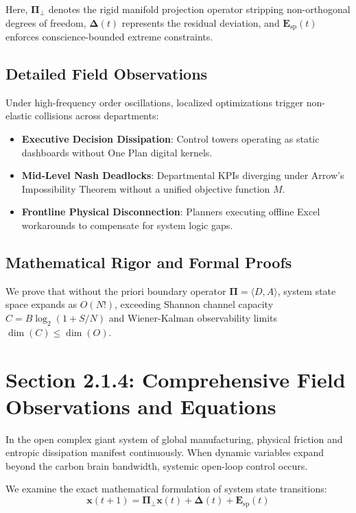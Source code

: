 \documentclass[12pt,a4paper,oneside]{book}
\begin{document}
Here, $\mathbf{\Pi}_{\bot}$ denotes the rigid manifold projection operator stripping non-orthogonal degrees of freedom, $\mathbf{\Delta}(t)$ represents the residual deviation, and $\mathbf{E}_{\mathrm{sp}}(t)$ enforces conscience-bounded extreme constraints.

\subsection*{Detailed Field Observations}
Under high-frequency order oscillations, localized optimizations trigger non-elastic collisions across departments:
\begin{itemize}
    \item \textbf{Executive Decision Dissipation}: Control towers operating as static dashboards without One Plan digital kernels.
    \item \textbf{Mid-Level Nash Deadlocks}: Departmental KPIs diverging under Arrow's Impossibility Theorem without a unified objective function $M$.
    \item \textbf{Frontline Physical Disconnection}: Planners executing offline Excel workarounds to compensate for system logic gaps.
\end{itemize}

\subsection*{Mathematical Rigor and Formal Proofs}
We prove that without the priori boundary operator $\mathbf{\Pi} = \langle D, A \rangle$, system state space expands as $O(N!)$, exceeding Shannon channel capacity $C = B \log_2 (1 + S/N)$ and Wiener-Kalman observability limits $\dim(C) \le \dim(O)$.
\clearpage
\section{Section 2.1.4: Comprehensive Field Observations and Equations}

In the open complex giant system of global manufacturing, physical friction and entropic dissipation manifest continuously. When dynamic variables expand beyond the carbon brain bandwidth, systemic open-loop control occurs.

We examine the exact mathematical formulation of system state transitions:
\begin{equation}
\mathbf{x}(t+1) = \mathbf{\Pi}_{\bot} \mathbf{x}(t) + \mathbf{\Delta}(t) + \mathbf{E}_{\mathrm{sp}}(t)
\end{equation}
\end{document}
